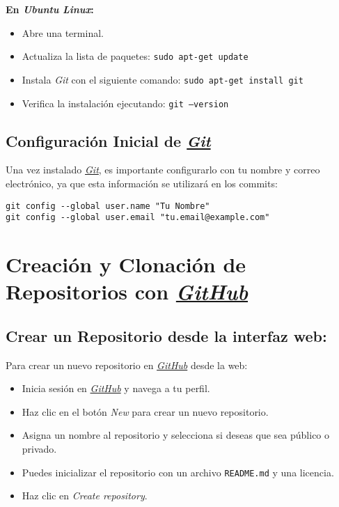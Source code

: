 \documentclass{template/uem_theme}
\begin{document}
\begin{uemClipBox}{
   \textbf{En \textit{Ubuntu} \textit{Linux}:}
    \begin{itemize}
        \item Abre una terminal.
        \item Actualiza la lista de paquetes: \texttt{sudo apt-get update}
        \item Instala \textit{Git} con el siguiente comando: \texttt{sudo apt-get install git}
        \item Verifica la instalación ejecutando: \texttt{git --version}
    \end{itemize}
}\end{uemClipBox}

\subsection{Configuración Inicial de \href{https://git-scm.com/}{\textit{Git}}}
Una vez instalado \href{https://git-scm.com/}{\textit{Git}}, es importante configurarlo con tu nombre y correo electrónico, ya que esta información se utilizará en los commits:

\begin{verbatim}
git config --global user.name "Tu Nombre"
git config --global user.email "tu.email@example.com"
\end{verbatim}

\newpage
\section{Creación y Clonación de Repositorios con \href{https://github.com}{\textit{GitHub}}}

\subsection{Crear un Repositorio desde la interfaz web:}

Para crear un nuevo repositorio en \href{https://github.com}{\textit{GitHub}} desde la web:
\begin{itemize}
    \item Inicia sesión en \href{https://github.com}{\textit{GitHub}} y navega a tu perfil.
    \item Haz clic en el botón \textit{New} para crear un nuevo repositorio.
    \item Asigna un nombre al repositorio y selecciona si deseas que sea público o privado.
    \item Puedes inicializar el repositorio con un archivo \texttt{README.md} y una licencia.
    \item Haz clic en \textit{Create repository}.
\end{itemize}
\end{document}
